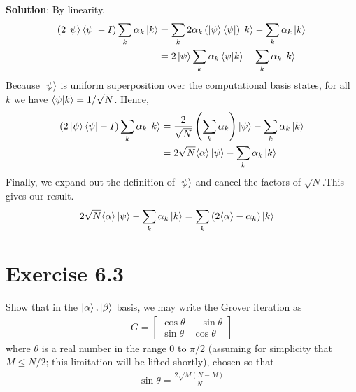 \documentclass{book}
\begin{document}
    \textbf{Solution}: By linearity,
    \begin{align*}
        (2\ket{\psi}\bra{\psi}-I)\sum_k \alpha_k\ket{k} &= \sum_k 2 \alpha_k\left(\ket{\psi}\bra{\psi}\right)\ket{k} - \sum_k \alpha_k\ket{k} \\
        &= 2\ket{\psi}\sum_k\alpha_k\braket{\psi}{k}-\sum_k\alpha_k\ket{k}
    \end{align*}
    Because $\ket{\psi}$ is uniform superposition over the computational basis states, for all $k$ we have $\braket{\psi}{k}=1/\sqrt{N}$. Hence,
    \begin{align}
    (2\ket{\psi}\bra{\psi}-I)\sum_k \alpha_k\ket{k} &= \frac{2}{\sqrt{N}}\left(\sum_k\alpha_k\right)\ket{\psi} - \sum_k \alpha_k\ket{k} \\
    &= 2\sqrt{N} \langle\alpha\rangle\ket{\psi} - \sum_k\alpha_k\ket{k}
    \end{align}
    Finally, we expand out the definition of $\ket{\psi}$ and cancel the factors of $\sqrt{N}$.This gives our result. 
    \begin{align}
        2\sqrt{N} \langle\alpha\rangle\ket{\psi} - \sum_k\alpha_k\ket{k} &= \sum_k\left(2\langle\alpha\rangle-\alpha_k\right)\ket{k}
    \end{align}

\section*{Exercise 6.3}
    Show that in the $\ket{\alpha}, \ket{\beta}$ basis, we may write the Grover iteration as
    \begin{align}
        G = 
        \begin{bmatrix} \label{eq:matrix_G}
            \cos\theta & -\sin\theta \\
            \sin\theta & \cos\theta
        \end{bmatrix}
    \end{align}
    where $\theta$ is a real number in the range 0 to $\pi/2$ (assuming for simplicity that $M\leq N/2$; this limitation will be lifted shortly), chosen so that
    \begin{align} \label{eq:theta_value}
        \sin\theta =\frac{2\sqrt{M(N-M)}}{N}
    \end{align}
    
\end{document}
